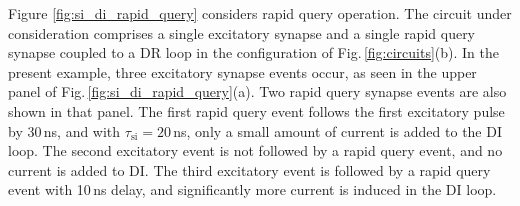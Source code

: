 \documentclass[twocolumn]{article}
\begin{document}
\begin{figure}[t!] 
\end{figure}
Figure \ref{fig:si_di_rapid_query} considers rapid query operation. The circuit under consideration comprises a single excitatory synapse and a single rapid query synapse coupled to a DR loop in the configuration of Fig.\,\ref{fig:circuits}(b). In the present example, three excitatory synapse events occur, as seen in the upper panel of Fig.\,\ref{fig:si_di_rapid_query}(a). Two rapid query synapse events are also shown in that panel. The first rapid query event follows the first excitatory pulse by 30\,ns, and with $\tau_{\mathrm{si}} = 20$\,ns, only a small amount of current is added to the DI loop. The second excitatory event is not followed by a rapid query event, and no current is added to DI. The third excitatory event is followed by a rapid query event with 10\,ns delay, and significantly more current is induced in the DI loop. 
\end{document}
